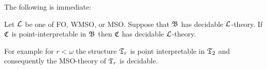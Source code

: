 The following is immediate:

\begin{proposition}
Let ${\mathcal L}$ be one of FO, WMSO, or MSO. Suppose that $\mathfrak{B}$ has decidable ${\mathcal L}$-theory. 
If $\mathfrak{C}$ is point-interpretable in $\mathfrak{B}$ then $\mathfrak{C}$ has decidable ${\mathcal L}$-theory.
\end{proposition}

For example  for $r < \omega$ the structure $\mathfrak{T}_r$ is point interpretable in $\mathfrak{T}_2$ and consequently the MSO-theory of $\mathfrak{T}_r$ is decidable.


% 
% 

